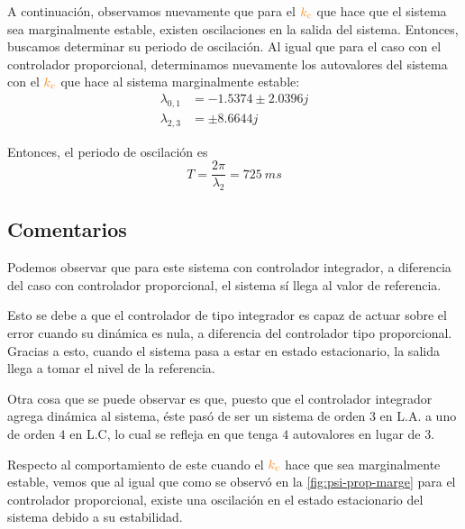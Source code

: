 \FloatBarrier

A continuación, observamos nuevamente que para el $\nara{k_{c}}$ que hace que el
sistema sea marginalmente estable, existen oscilaciones en la salida del sistema.
Entonces, buscamos determinar su periodo de oscilación. Al igual que para el caso
con el controlador proporcional, determinamos nuevamente los autovalores del sistema
con el $\nara{k_{c}}$ que hace al sistema marginalmente estable:
\begin{align*}
  \lambda_{0,1} &= -1.5374 \pm 2.0396j \\
  \lambda_{2,3} &= \pm 8.6644j
\end{align*}

Entonces, el periodo de oscilación es
\begin{equation}
  T = \frac{2\pi}{\mathfrak{\lambda_{2}}} = 725\ \unit{ms}
\end{equation}



\subsection{Comentarios}

Podemos observar que para este sistema con controlador integrador, a diferencia
del caso con controlador proporcional, el sistema sí llega al valor de referencia.

Esto se debe a que el controlador de tipo integrador es capaz de actuar sobre el
error cuando su dinámica es nula, a diferencia del controlador tipo proporcional.
Gracias a esto, cuando el sistema pasa a estar en estado estacionario, la salida
llega a tomar el nivel de la referencia.

Otra cosa que se puede observar es que, puesto que el controlador integrador
agrega dinámica al sistema, éste pasó de ser un sistema de orden $3$ en L.A. a
uno de orden $4$ en L.C, lo cual se refleja en que tenga $4$ autovalores en lugar
de $3$.

Respecto al comportamiento de este cuando el $\nara{k_{c}}$ hace que sea
marginalmente estable, vemos que al igual que como se observó en la \autoref{fig:psi-prop-marge}
para el controlador proporcional, existe una oscilación en el estado estacionario
del sistema debido a su estabilidad.
